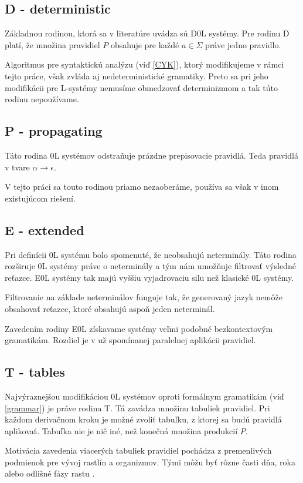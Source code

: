 \subsection*{D - deterministic}
Základnou rodinou, ktorá sa v literatúre uvádza sú D0L systémy. Pre rodinu D platí, že množina pravidiel $ P $ obsahuje pre každé $ a \in \Sigma $ práve jedno pravidlo.

Algoritmus pre syntaktickú analýzu (viď \ref{CYK}), ktorý modifikujeme v rámci tejto práce, však zvláda aj nedeterministické gramatiky. Preto sa pri jeho modifikácii pre L-systémy nemusíme obmedzovať determinizmom a tak túto rodinu nepoužívame.

\subsection*{P - propagating}
Táto rodina 0L systémov odstraňuje prázdne prepisovacie pravidlá. Teda pravidlá v tvare $\alpha \to \epsilon$.

V tejto práci sa touto rodinou priamo nezaoberáme, používa sa však v inom existujúcom riešení.

\subsection*{E - extended}
\label{extended}
Pri definícii 0L systému bolo spomenuté, že neobsahujú neterminály. Táto rodina rozširuje 0L systémy práve o neterminály a tým nám umožňuje filtrovať výsledné reťazce. E0L systémy tak majú vyššiu vyjadrovaciu silu než klasické 0L systémy.

Filtrovanie na základe neterminálov funguje tak, že generovaný jazyk nemôže obsahovať reťazce, ktoré obsahujú aspoň jeden neterminál.

Zavedením rodiny E0L získavame systémy veľmi podobné bezkontextovým gramatikám. Rozdiel je v už spomínanej paralelnej aplikácii pravidiel.


\subsection*{T - tables}
\label{tables}
Najvýraznejšou modifikáciou 0L systémov oproti formálnym gramatikám (viď \ref{grammar}) je práve rodina T. Tá zavádza množinu tabuliek pravidiel. Pri každom derivačnom kroku je možné zvoliť tabuľku, z ktorej sa budú pravidlá aplikovať. Tabuľka nie je nič iné, než konečná množina produkcií $P$.

Motivácia zavedenia viacerých tabuliek pravidiel pochádza z premenlivých podmienok pre vývoj rastlín a organizmov. Tými môžu byť rôzne časti dňa, roka alebo odlišné fázy rastu \cite{handbook}.

